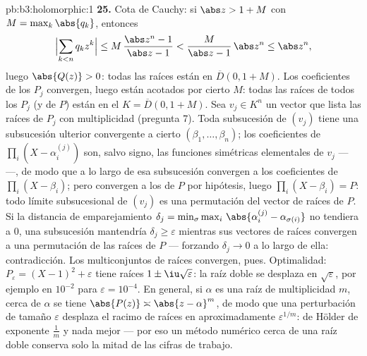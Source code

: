 \begin{solution}{pb:b3:holomorphic:1}
\textbf{25.} Cota de Cauchy: si $\abs z > 1 + M$ con $M =
\max_k\abs{q_k}$, entonces
\[
\Bigl|\sum_{k<n}q_kz^k\Bigr|
\leq M\,\frac{\abs z^n - 1}{\abs z - 1}
< \frac{M}{\abs z - 1}\,\abs z^n \leq \abs z^n,
\]
luego $\abs{Q(z)} > 0$: todas las raíces están en $\overline D(0, 1+M)$.
Los coeficientes de los $P_j$ convergen, luego están acotados por cierto
$M$: todas las raíces de todos los $P_j$ (y de $P$) están en el
 $K = \overline D(0, 1 + M)$.
Sea $v_j \in K^n$ un vector que lista las raíces de $P_j$ con
multiplicidad (pregunta 7). Toda subsucesión de $(v_j)$ tiene una
subsucesión ulterior convergente a cierto $(\beta_1, \dots, \beta_n)$;
los coeficientes de $\prod_i(X - \alpha_i^{(j)})$ son, salvo signo, las
funciones simétricas elementales de $v_j$ ---
 ---, de modo que a lo
largo de esa subsucesión convergen a los coeficientes de
$\prod_i(X - \beta_i)$; pero convergen a los de $P$ por hipótesis, luego
$\prod_i(X -
\beta_i) = P$: todo límite subsucesional de $(v_j)$ es una permutación
del vector de raíces de $P$. Si la distancia de emparejamiento
$\delta_j = \min_\sigma\max_i\,
\abs{\alpha_i^{(j)} - \alpha_{\sigma(i)}}$ no tendiera a $0$, una
subsucesión mantendría $\delta_j \geq \varepsilon$ mientras sus vectores
de raíces convergen a una permutación de las raíces de $P$ --- forzando
$\delta_j \to 0$ a lo largo de ella: contradicción. Los multiconjuntos
de raíces convergen, pues. Optimalidad:
$P_\varepsilon = (X - 1)^2 + \varepsilon$ tiene raíces $1 \pm
\iu\sqrt\varepsilon$: la raíz doble se desplaza en $\sqrt\varepsilon$,
por ejemplo en $10^{-2}$ para $\varepsilon =
10^{-4}$. En general, si $\alpha$ es una raíz de multiplicidad $m$,
cerca de $\alpha$ se tiene $\abs{P(z)} \asymp \abs{z -
\alpha}^m$, de modo que una perturbación de tamaño $\varepsilon$
desplaza el racimo de raíces en aproximadamente $\varepsilon^{1/m}$:
 de Hölder de exponente
$\frac1m$ y nada mejor --- por eso un método numérico cerca de una raíz
doble conserva solo la mitad de las cifras de trabajo.
\end{solution}

